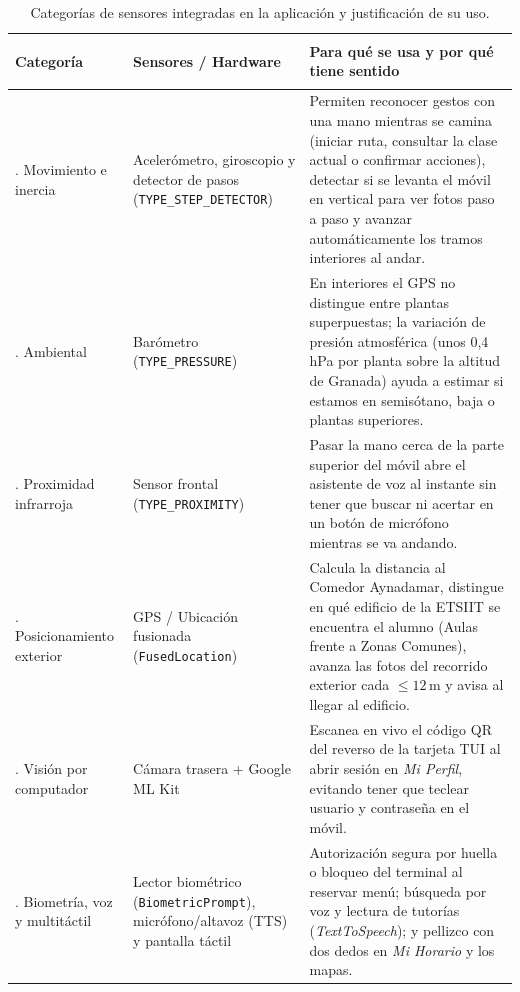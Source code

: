 \documentclass[11pt,a4paper]{article}
\begin{document}
\begin{table}[H]
\centering
\footnotesize
\renewcommand{\arraystretch}{1.18}
\begin{tabularx}{\textwidth}{>{\bfseries\raggedright\arraybackslash}p{2.4cm} >{\raggedright\arraybackslash}p{3.2cm} X}
\toprule
\textbf{Categoría} & \textbf{Sensores / Hardware} & \textbf{Para qué se usa y por qué tiene sentido} \\
\midrule
1. Movimiento e inercia & Acelerómetro, giroscopio y detector de pasos (\texttt{TYPE\_STEP\_DETECTOR}) & Permiten reconocer gestos con una mano mientras se camina (iniciar ruta, consultar la clase actual o confirmar acciones), detectar si se levanta el móvil en vertical para ver fotos paso a paso y avanzar automáticamente los tramos interiores al andar. \\
2. Ambiental & Barómetro (\texttt{TYPE\_PRESSURE}) & En interiores el GPS no distingue entre plantas superpuestas; la variación de presión atmosférica (unos 0,4\,hPa por planta sobre la altitud de Granada) ayuda a estimar si estamos en semisótano, baja o plantas superiores. \\
3. Proximidad infrarroja & Sensor frontal (\texttt{TYPE\_PROXIMITY}) & Pasar la mano cerca de la parte superior del móvil abre el asistente de voz al instante sin tener que buscar ni acertar en un botón de micrófono mientras se va andando. \\
4. Posicionamiento exterior & GPS / Ubicación fusionada (\texttt{FusedLocation}) & Calcula la distancia al Comedor Aynadamar, distingue en qué edificio de la ETSIIT se encuentra el alumno (Aulas frente a Zonas Comunes), avanza las fotos del recorrido exterior cada $\le 12$\,m y avisa al llegar al edificio. \\
5. Visión por computador & Cámara trasera + Google ML Kit & Escanea en vivo el código QR del reverso de la tarjeta TUI al abrir sesión en \textit{Mi Perfil}, evitando tener que teclear usuario y contraseña en el móvil. \\
6. Biometría, voz y multitáctil & Lector biométrico (\texttt{BiometricPrompt}), micrófono/altavoz (TTS) y pantalla táctil & Autorización segura por huella o bloqueo del terminal al reservar menú; búsqueda por voz y lectura de tutorías (\textit{TextToSpeech}); y pellizco con dos dedos en \textit{Mi Horario} y los mapas. \\
\bottomrule
\end{tabularx}
\caption{Categorías de sensores integradas en la aplicación y justificación de su uso.}
\label{tab:sensores}
\end{table}
\end{document}
